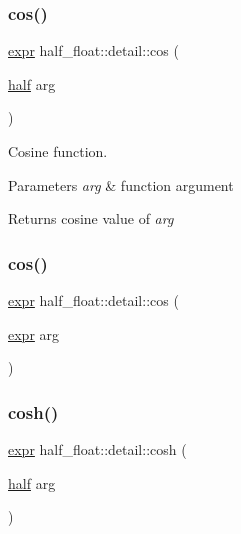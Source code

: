 \subsubsection{\texorpdfstring{cos()}{cos()}\hspace{0.1cm}{\footnotesize\ttfamily [1/2]}}
{\footnotesize\ttfamily \hyperlink{structhalf__float_1_1detail_1_1expr}{expr} half\+\_\+float\+::detail\+::cos (\begin{DoxyParamCaption}\item[{\hyperlink{classhalf__float_1_1half}{half}}]{arg }\end{DoxyParamCaption})\hspace{0.3cm}{\ttfamily [inline]}}

Cosine function. 
\begin{DoxyParams}{Parameters}
{\em arg} & function argument \\
\hline
\end{DoxyParams}
\begin{DoxyReturn}{Returns}
cosine value of {\itshape arg} 
\end{DoxyReturn}
\mbox{\label{namespacehalf__float_1_1detail_a79354f6efe07d6587202e75395d31f49}} 
\subsubsection{\texorpdfstring{cos()}{cos()}\hspace{0.1cm}{\footnotesize\ttfamily [2/2]}}
{\footnotesize\ttfamily \hyperlink{structhalf__float_1_1detail_1_1expr}{expr} half\+\_\+float\+::detail\+::cos (\begin{DoxyParamCaption}\item[{\hyperlink{structhalf__float_1_1detail_1_1expr}{expr}}]{arg }\end{DoxyParamCaption})\hspace{0.3cm}{\ttfamily [inline]}}

\mbox{\label{namespacehalf__float_1_1detail_a4eca9c9999253f864e291defe7acc67b}} 
\subsubsection{\texorpdfstring{cosh()}{cosh()}\hspace{0.1cm}{\footnotesize\ttfamily [1/2]}}
{\footnotesize\ttfamily \hyperlink{structhalf__float_1_1detail_1_1expr}{expr} half\+\_\+float\+::detail\+::cosh (\begin{DoxyParamCaption}\item[{\hyperlink{classhalf__float_1_1half}{half}}]{arg }\end{DoxyParamCaption})\hspace{0.3cm}{\ttfamily [inline]}}

